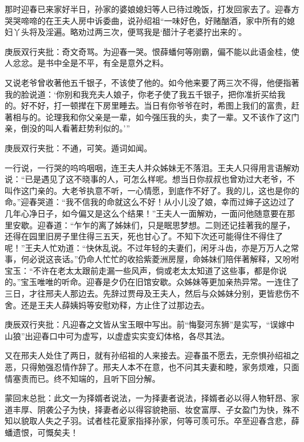 \begin{parag}


    那时迎春已来家好半日，孙家的婆娘媳妇等人已待过晚饭，打发回家去了。迎春方哭哭啼啼的在王夫人房中诉委曲，说孙绍祖“一味好色，好赌酗酒，家中所有的媳妇丫头将及淫遍。略劝过两三次，便骂我是‘醋汁子老婆拧出来的’。\begin{note}庚辰双行夹批：奇文奇骂。为迎春一哭。恨薛蟠何等刚霸，偏不能以此语金桂，使人忿忿。是书中全是不平，有全是意外之料。\end{note}又说老爷曾收著他五千银子，不该使了他的。如今他来要了两三次不得，他便指著我的脸说道：‘你别和我充夫人娘子，你老子使了我五千银子，把你准折买给我的。好不好，打一顿撵在下房里睡去。当日有你爷爷在时，希图上我们的富贵，赶著相与的。论理我和你父亲是一辈，如今强压我的头，卖了一辈。又不该作了这门亲，倒没的叫人看著赶势利似的。’”\begin{note}庚辰双行夹批：不通，可笑。遁词如闻。\end{note}一行说，一行哭的呜呜咽咽，连王夫人并众姊妹无不落泪。王夫人只得用言语解劝说：“已是遇见了这不晓事的人，可怎么样呢。想当日你叔叔也曾劝过大老爷，不叫作这门亲的。大老爷执意不听，一心情愿，到底作不好了。我的儿，这也是你的命。”迎春哭道：“我不信我的命就这么不好！从小儿没了娘，幸而过婶子这边过了几年心净日子，如今偏又是这么个结果！”王夫人一面解劝，一面问他随意要在那里安歇。迎春道：“乍乍的离了姊妹们，只是眠思梦想。二则还记挂著我的屋子，还得在园里旧房子里住得三五天，死也甘心了。不知下次还可能得住不得住了呢！”王夫人忙劝道：“快休乱说。不过年轻的夫妻们，闲牙斗齿，亦是万万人之常事，何必说这丧话。”仍命人忙忙的收拾紫菱洲房屋，命姊妹们陪伴著解释，又吩咐宝玉：“不许在老太太跟前走漏一些风声，倘或老太太知道了这些事，都是你说的。”宝玉唯唯的听命。迎春是夕仍在旧馆安歇。众姊妹等更加亲热异常。一连住了三日，才往邢夫人那边去。先辞过贾母及王夫人，然后与众姊妹分别，更皆悲伤不舍。还是王夫人薛姨妈等安慰劝释，方止住了过那边去。\begin{note}庚辰双行夹批：凡迎春之文皆从宝玉眼中写出。前“悔娶河东狮”是实写，“误嫁中山狼”出迎春口中可为虚写，以虚虚实实变幻体格，各尽其法。\end{note}又在邢夫人处住了两日，就有孙绍祖的人来接去。迎春虽不愿去，无奈惧孙绍祖之恶，只得勉强忍情作辞了。邢夫人本不在意，也不问其夫妻和睦，家务烦难，只面情塞责而已。终不知端的，且听下回分解。
\end{parag}

\begin{parag}

    \begin{note}蒙回末总批：此文一为择婿者说法，一为择妻者说法，择婿者必以得人物轩昂、家道丰厚、阴袭公子为快，择妻者必以得容貌艳丽、妆奁富厚、子女盈门为快，殊不知以貌取人失之子羽。试者桂花夏家指择孙家，何等可羡可乐。卒至迎春含悲，薛蟠遗恨，可慨矣夫！\end{note}
\end{parag}
